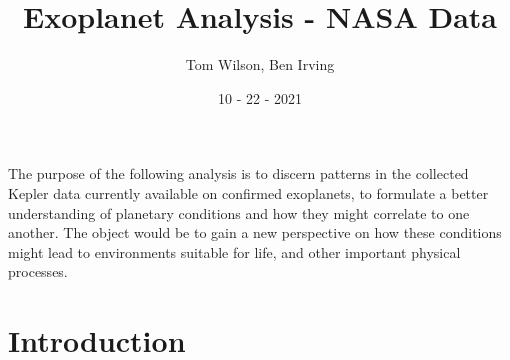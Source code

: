 \documentclass[12pt]{article}
\title{Exoplanet Analysis - NASA Data}
\author{Tom Wilson, Ben Irving}
\date{10 - 22 - 2021}
\begin{document}
\maketitle

\abstract
The purpose of the following analysis is to discern patterns in the collected Kepler data currently available on confirmed exoplanets, to formulate a better understanding of planetary conditions and how they might correlate to one another. The object would be to gain a new perspective on how these conditions might lead to environments suitable for life, and other important physical processes. 
\section{Introduction}
\paragraph*{}
\end{document}
